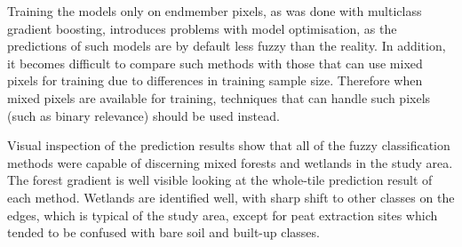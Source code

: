 \documentclass[a4paper,10pt]{book}
\begin{document}
Training the models only on endmember pixels, as was done with multiclass gradient boosting, introduces problems with model optimisation, as the predictions of such models are by default less fuzzy than the reality. In addition, it becomes difficult to compare such methods with those that can use mixed pixels for training due to differences in training sample size. Therefore when mixed pixels are available for training, techniques that can handle such pixels (such as binary relevance) should be used instead.

Visual inspection of the prediction results show that all of the fuzzy classification methods were capable of discerning mixed forests and wetlands in the study area. The forest gradient is well visible looking at the whole-tile prediction result of each method. Wetlands are identified well, with sharp shift to other classes on the edges, which is typical of the study area, except for peat extraction sites which tended to be confused with bare soil and built-up classes.


\end{document}
